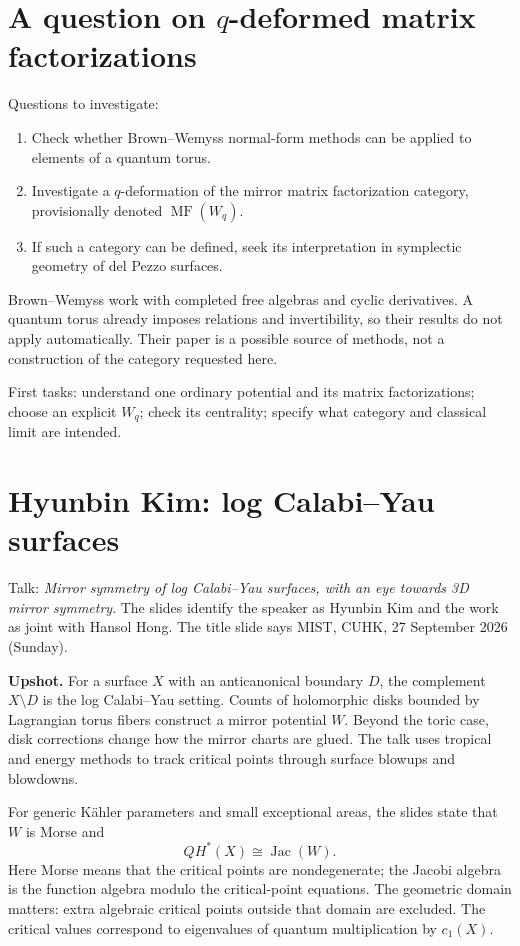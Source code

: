 \section{A question on $q$-deformed
matrix factorizations}
\label{section-galkin-question}

\noindent
Questions to investigate:
\begin{enumerate}
\item Check whether Brown--Wemyss
normal-form methods can be applied
to elements of a quantum torus.
\item Investigate a $q$-deformation
of the mirror matrix factorization
category, provisionally denoted
$\operatorname{MF}(W_q)$.
\item If such a category can be
defined, seek its interpretation
in symplectic geometry of del Pezzo
surfaces.
\end{enumerate}

\noindent
Brown--Wemyss work with completed free
algebras and cyclic derivatives.
A quantum torus already imposes
relations and invertibility, so their
results do not apply automatically.
Their paper is a possible source of
methods, not a construction of the
category requested here.

First tasks: understand one ordinary
potential and its matrix factorizations;
choose an explicit $W_q$; check its
centrality; specify what category and
classical limit are intended.

\section{Hyunbin Kim: log Calabi--Yau
surfaces}
\label{section-kim-log-cy-surfaces}

\noindent
Talk: \textit{Mirror symmetry of
log Calabi--Yau surfaces, with an eye
towards 3D mirror symmetry}.
The slides identify the speaker
as Hyunbin Kim and the work as joint
with Hansol Hong. The title slide says
MIST, CUHK, 27 September 2026
(Sunday).

\medskip\noindent
\textbf{Upshot.}
For a surface $X$ with an anticanonical
boundary $D$, the complement $X\setminus D$
is the log Calabi--Yau setting.
Counts of holomorphic disks bounded by
Lagrangian torus fibers construct a
mirror potential $W$.
Beyond the toric case, disk corrections
change how the mirror charts are glued.
The talk uses tropical and energy
methods to track critical points
through surface blowups and blowdowns.

For generic K\"ahler parameters and small
exceptional areas, the slides state
that $W$ is Morse and
$$
QH^*(X)\cong\operatorname{Jac}(W).
$$
Here Morse means that the critical points
are nondegenerate; the Jacobi algebra
is the function algebra modulo the
critical-point equations.
The geometric domain matters:
extra algebraic critical points outside
that domain are excluded.
The critical values correspond to
eigenvalues of quantum multiplication
by $c_1(X)$.

